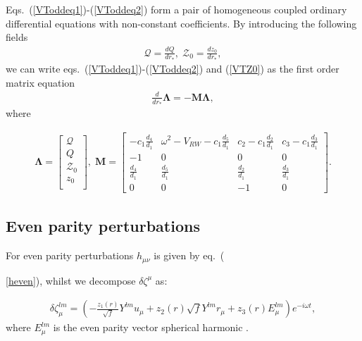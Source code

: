 \documentclass[10pt,twocolumn,preprintnumbers,amsmath,amssymb,nofootinbib
,superscriptaddress]{revtex4-1}
\begin{document}
{Eqs.~(\ref{VToddeq1})-(\ref{VToddeq2}) form a pair of homogeneous coupled ordinary differential equations with non-constant coefficients. By introducing the following fields
\begin{align}
\mathcal{Q}=\frac{dQ}{dr_\ast},\;\mathcal{Z}_0=\frac{dz_0}{dr_\ast},\label{VTZ0}
\end{align}
we can write eqs.~(\ref{VToddeq1})-(\ref{VToddeq2}) and (\ref{VTZ0}) as the first order matrix equation
\begin{align}
\frac{d}{dr_\ast}\bm{\Lambda}=-\bm{M}\bm{\Lambda},
\end{align}
where
\begin{widetext}
\begin{align}
\bm{\Lambda}=\begin{bmatrix}
\mathcal{Q}\\
Q\\
\mathcal{Z}_0\\
z_0\\
\end{bmatrix},\;
\bm{M}=\begin{bmatrix}
-c_1\frac{d_4}{d_1}&\omega^2-V_{RW}-c_1\frac{d_5}{d_1}&c_2-c_1\frac{d_2}{d_1}&c_3-c_1\frac{d_3}{d_1}\\
-1&0&0&0\\
\frac{d_4}{d_1}&\frac{d_5}{d_1}&\frac{d_2}{d_1}&\frac{d_3}{d_1}\\
0&0&-1&0
\end{bmatrix}.
\end{align}
\end{widetext}

\subsection{Even parity perturbations}\label{VTeven}
For even parity perturbations $h_{\mu\nu}$ is given by eq.~({\ref{heven}), whilst we decompose $\delta\zeta^\mu$ as:

\begin{align}
\delta\zeta_\mu^{lm}=\left(-\frac{z_1(r)}{\sqrt{f}}Y^{lm}u_\mu + z_2(r)\sqrt{f}Y^{lm}r_\mu + z_3(r)E^{lm}_\mu\right)e^{-i\omega t},
\end{align}
where $E^{lm}_\mu$ is the even parity vector spherical harmonic \cite{Martel:2005ir,Ripley:2017kqg}. 

}}
\end{document}
